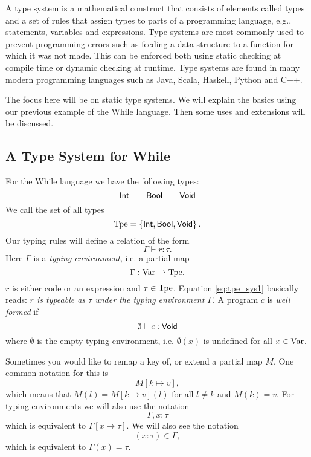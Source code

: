 A type system is a mathematical construct that consists of elements called types
and a set of rules that assign types to parts of a programming language, e.g.,
statements, variables and expressions. Type systems are most commonly used to
prevent programming errors such as feeding a data structure to a function for
which it was not made. This can be enforced both using static checking at
compile time or dynamic checking at runtime. Type systems are found in many
modern programming languages such as Java, Scala, Haskell, Python and C++.

The focus here will be on static type systems. We will explain the basics using
our previous example of the While language. Then some uses and extensions will be
discussed.

\subsection{A Type System for While}
\label{sub:a_type_system_for_while}

For the While language we have the following types:
\begin{equation*}
  \mbox{$\mathsf{Int}$} \quad\quad \mbox{$\mathsf{Bool}$} \quad\quad \mbox{$\mathsf{Void}$}
\end{equation*}
We call the set of all types 
\begin{equation*}
  \mbox{$\mathrm{Tpe}$} = \left\{ \mbox{$\mathsf{Int}$}, \mbox{$\mathsf{Bool}$}, \mbox{$\mathsf{Void}$} \right\}.
\end{equation*}
Our typing rules will define a relation of the form
\begin{equation} \label{eq:tpe_sys1}
  \Gamma \vdash r : \tau.
\end{equation}
Here $\Gamma$ is a \emph{typing environment}, i.e. a partial map
\begin{equation*}
  \Gamma: \mbox{$\mathrm{Var}$} \rightharpoonup \mbox{$\mathrm{Tpe}$}.
\end{equation*}
$r$ is either code or an expression and $\tau \in \mbox{$\mathrm{Tpe}$}$.
Equation \eqref{eq:tpe_sys1} basically reads: {\it $r$ is typeable as $\tau$ under the
typing environment $\Gamma$}. A program $c$ is \emph{well formed} if
\begin{equation*}
  \emptyset \vdash c : \mbox{$\mathsf{Void}$}
\end{equation*}
where $\emptyset$ is the empty typing environment, i.e. $\emptyset(x)$ is
undefined for all $x \in \mbox{$\mathrm{Var}$}$.

\begin{notation}
  Sometimes you would like to remap a key of, or extend a partial map $M$. One
  common notation
  for this is 
  \begin{equation*}
    M[k \mapsto v],
  \end{equation*}
  which means that $M(l) = M[k \mapsto v](l)$ for all $l \neq k$ and
  $M(k) = v$.
  For typing environments we will also use the notation
  \begin{equation*}
    \Gamma, x: \tau
  \end{equation*}
  which is equivalent to $\Gamma[x \mapsto \tau]$. We will also see the notation
  \begin{equation*}
    (x: \tau) \in \Gamma,
  \end{equation*}
  which is equivalent to $\Gamma(x) = \tau$.
\end{notation}

